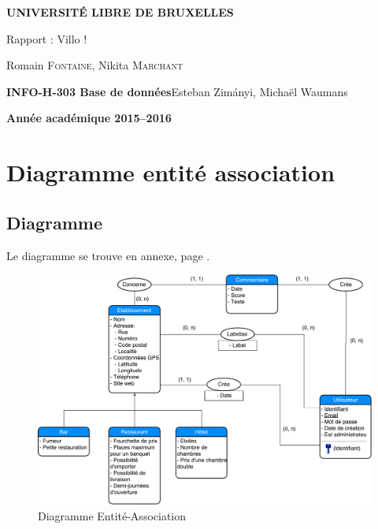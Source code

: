 \documentclass[10pt,a4paper]{article}
\begin{document}
\begin{titlepage}
    \begin{center}
        \textbf{\textsc{UNIVERSIT\'E LIBRE DE BRUXELLES}}\\
        \vfill{}\vfill{}
        \begin{center}{\Huge Rapport : Villo !}\end{center}{\Huge \par}
        \begin{center}{\large Romain \textsc{Fontaine}, Nikita \textsc{Marchant}}\end{center}{\Huge \par}
        \vfill{}\vfill{} \vfill{}
        \begin{flushleft}{\large \textbf{INFO-H-303 Base de données}}\hfill{Esteban Zimányi, Michaël Waumans}\end{flushleft}{\large\par}
        \vfill{}\vfill{}\enlargethispage{3cm}
        \textbf{Année académique 2015--2016}
    \end{center}
\end{titlepage}

\setlength{\parindent}{1.5em}
\setlength{\parskip}{1em}
\linespread{1.1}





\section{Diagramme entité association}
\subsection{Diagramme}

Le diagramme se trouve en annexe, page \pageref{diagram}.

\begin{figure}[H]
    \includegraphics[angle=90, scale=0.6]{EA.pdf}
    \caption{Diagramme Entité-Association}
    \label{diagram}
\end{figure}
\end{document}

